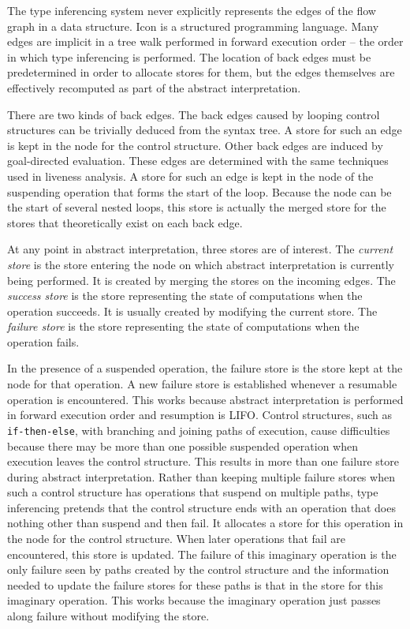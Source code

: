 The type inferencing system never explicitly represents the edges of
the flow graph in a data structure. Icon is a structured programming
language. Many edges are implicit in a tree walk performed in forward
execution order -- the order in which type inferencing is
performed. The location of back edges must be predetermined in order
to allocate stores for them, but the edges themselves are effectively
recomputed as part of the abstract interpretation.

There are two kinds of back edges. The back edges caused by looping
control structures can be trivially deduced from the syntax tree. A
store for such an edge is kept in the node for the control
structure. Other back edges are induced by goal-directed
evaluation. These edges are determined with the same techniques used
in liveness analysis. A store for such an edge is kept in the node of
the suspending operation that forms the start of the loop. Because the
node can be the start of several nested loops, this store is actually
the merged store for the stores that theoretically exist on each back
edge.

At any point in abstract interpretation, three stores are of
interest. The \textit{current store} is the store entering the node on
which abstract interpretation is currently being performed. It is
created by merging the stores on the incoming edges. The
\textit{success store} is the store representing the state of
computations when the operation succeeds. It is usually created by
modifying the current store. The \textit{failure store} is the store
representing the state of computations when the operation fails.

In the presence of a suspended operation, the failure store is the
store kept at the node for that operation. A new failure store is
established whenever a resumable operation is encountered. This works
because abstract interpretation is performed in forward execution
order and resumption is LIFO. Control structures, such as
\texttt{if-then-else}, with branching and joining paths of execution, cause
difficulties because there may be more than one possible suspended
operation when execution leaves the control structure. This results in
more than one failure store during abstract interpretation. Rather
than keeping multiple failure stores when such a control structure has
operations that suspend on multiple paths, type inferencing pretends
that the control structure ends with an operation that does nothing
other than suspend and then fail. It allocates a store for this
operation in the node for the control structure. When later operations
that fail are encountered, this store is updated. The failure of this
imaginary operation is the only failure seen by paths created by the
control structure and the information needed to update the failure
stores for these paths is that in the store for this imaginary
operation. This works because the imaginary operation just passes
along failure without modifying the store.


